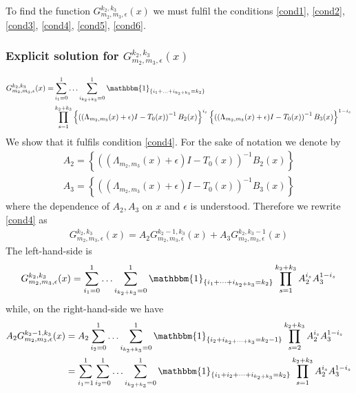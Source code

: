 \documentclass[11pt]{article}
\numberwithin{equation}{section}
\numberwithin{equation}{subsection}
\begin{document}
To find the function $G_{m_{2},m_{3},\epsilon}^{k_{2},k_{3}}(x)$ we must fulfil the conditions \eqref{cond1}, \eqref{cond2}, \eqref{cond3}, \eqref{cond4}, \eqref{cond5}, \eqref{cond6}.
\subsubsection{Explicit solution for $G_{m_{2},m_{3},\epsilon}^{k_{2},k_{3}}(x)$}
\begin{equation}
	\begin{split}
		G_{m_{2},m_{3},\epsilon}^{k_{2},k_{3}}(x)=&\sum_{i_{1}=0}^{1}\ldots\sum_{i_{k_{2}+k_{3}}=0}^{1}\mathbbm{1}_{\{i_{1}+\ldots+i_{k_{2}+k_{3}}=k_{2}\}}
		\\&
		\prod_{s=1}^{k_{2}+k_{3}}\left\{\left((\Lambda_{m_{2},m_{3}}(x)+\epsilon)I-T_{0}(x)\right)^{-1}B_{2}(x)\right\}^{i_{s}}\left\{\left((\Lambda_{m_{2},m_{3}}(x)+\epsilon)I-T_{0}(x)\right)^{-1}B_{3}(x)\right\}^{1-i_{s}}
	\end{split}
\end{equation}
We show that it fulfils condition \eqref{cond4}. For the sake of notation we denote by 
\begin{equation}
	\begin{split}
	A_{2}= \left\{\left((\Lambda_{m_{2},m_{3}}(x)+\epsilon)I-T_{0}(x)\right)^{-1}B_{2}(x)\right\}\\
	A_{3}=\left\{\left((\Lambda_{m_{2},m_{3}}(x)+\epsilon)I-T_{0}(x)\right)^{-1}B_{3}(x)\right\}
	\end{split}
\end{equation}
where the dependence of $A_{2},A_{3}$ on $x$ and $\epsilon$ is understood. 
Therefore we rewrite \eqref{cond4} as 
\begin{equation}
	\begin{split}
		G_{m_{2},m_{3},\epsilon}^{k_{2},k_{3}}(x)=A_{2}G_{m_{2},m_{3},\epsilon}^{k_{2}-1,k_{3}}(x)+A_{3}G_{m_{2},m_{3},\epsilon}^{k_{2},k_{3}-1}(x)
	\end{split}
\end{equation}
The left-hand-side is 
\begin{equation}
		G_{m_{2},m_{3},\epsilon}^{k_{2},k_{3}}(x)=\sum_{i_{1}=0}^{1}\ldots\sum_{i_{k_{2}+k_{3}}=0}^{1}\mathbbm{1}_{\{i_{1}+\cdots+i_{k_{2}+k_{3}}=k_{2}\}}\prod_{s=1}^{k_{2}+k_{3}}A_{2}^{i_{s}}A_{3}^{1-i_{s}}
\end{equation}
while, on the right-hand-side we have
\begin{equation}
	\begin{split}
A_{2}G_{m_{2},m_{3},\epsilon}^{k_{2}-1,k_{3}}(x)&=A_{2}\sum_{i_{2}=0}^{1}\ldots\sum_{i_{k_{2}+k_{3}}=0}^{1}\mathbbm{1}_{\{i_{2}+i_{k_{2}+\cdots+k_{3}}=k_{2}-1\}}\prod_{s=2}^{k_{2}+k_{3}}A_{2}^{i_{s}}A_{3}^{1-i_{s}}
\\&=
\sum_{i_{1}=1}^{1}\sum_{i_{2}=0}^{1}\ldots\sum_{i_{k_{2}+k_{3}}=0}^{1}\mathbbm{1}_{\{i_{1}+i_{2}+\cdots+i_{k_{2}+k_{3}}=k_{2}\}}\prod_{s=1}^{k_{2}+k_{3}}A_{2}^{i_{s}}A_{3}^{1-i_{s}}
	\end{split}
\end{equation}
\end{document}

